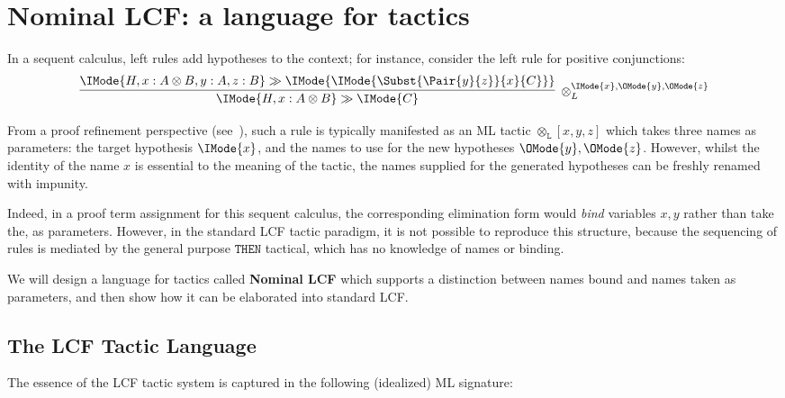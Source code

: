 \chapter{Nominal LCF: a language for tactics}

In a sequent calculus, left rules add hypotheses to the context; for instance,
consider the left rule for positive conjunctions:
\[
  \infer[{\otimes_L^{\IMode{x},\OMode{y},\OMode{z}}}]{
    \IMode{H,x:A\otimes B}\gg\IMode{C}
  }{
    \IMode{H,x:A\otimes B,y:A,z:B}\gg\IMode{
      \IMode{\Subst{\Pair{y}{z}}{x}{C}}
    }
  }
\]
%

From a proof refinement perspective (see~\cite{constable:1986}), such a rule is
typically manifested as an ML tactic $\mathtt{\otimes_L}[x,y,z]$ which takes
three names as parameters: the target hypothesis $\IMode{x}$, and the names to
use for the new hypotheses $\OMode{y},\OMode{z}$. However, whilst the identity
of the name $x$ is essential to the meaning of the tactic, the names supplied
for the generated hypotheses can be freshly renamed with impunity.

Indeed, in a proof term assignment for this sequent calculus, the corresponding
elimination form would \emph{bind} variables $x,y$ rather than take the, as
parameters. However, in the standard LCF tactic paradigm, it is not possible to
reproduce this structure, because the sequencing of rules is mediated by the
general purpose $\mathtt{THEN}$ tactical, which has no knowledge of names or
binding.

We will design a language for tactics called \textbf{Nominal LCF} which
supports a distinction between names bound and names taken as parameters, and
then show how it can be elaborated into standard LCF.

\section{The LCF Tactic Language}
\newcommand\MLTypeDecl[1]{\mathtt{type}\ #1}
\newcommand\PartialFun[2]{#1\rightharpoonup #2}
\newcommand\LCFJudgment{\mathit{judgment}}
\newcommand\LCFEvidence{\mathit{evidence}}
\newcommand\LCFTactic{\mathit{tactic}}
\newcommand\MLList[1]{#1\;\mathit{list}}
\newcommand\MLAtom{\mathbb{A}}
\newcommand\MLNat{\mathbb{N}}
\newcommand\MLStream[1]{{#1}^{\MLNat}}
\newcommand\LCFAtomicTactic{\mathit{atactic}}
\newcommand\StreamTake[2]{\bar{#1}(#2)}

The essence of the LCF tactic system is captured in the following (idealized)
ML signature:

